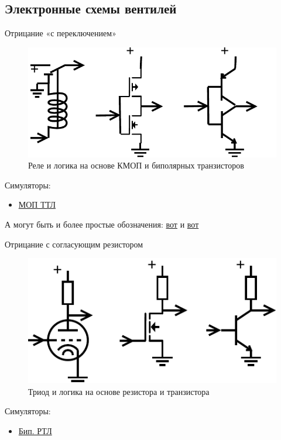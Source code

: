 \documentclass[xetex,aspectratio=43]{beamer}
\begin{document}
\subsection{Электронные схемы вентилей}

\begin{frame}{Отрицание «с переключением»}
    \begin{figure}
        \includegraphics[height=0.5\textheight]{img/07.not_switch.pdf}
        \caption{Реле и логика на основе КМОП и биполярных транзисторов}
    \end{figure}
    Симуляторы:
    \begin{itemize}
        \item \href{https://www.falstad.com/circuit/e-cmosinverter.html}{МОП ТТЛ}
    \end{itemize}
    \pause
    А могут быть и более простые обозначения: \href{https://en.wikipedia.org/wiki/CMOS}{вот} и \href{https://github.com/dluciv/Computer_Architecture-SPbU-CB.5080/tree/main/circuits}{вот}
\end{frame}

\begin{frame}{Отрицание с согласующим резистором}
    \begin{figure}
        \includegraphics[height=0.5\textheight]{img/07.not_resist.pdf}
        \caption{Триод и логика на основе резистора и транзистора}
    \end{figure}
    Симуляторы:
    \begin{itemize}
        \item \href{https://www.falstad.com/circuit/e-rtlinverter.html}{Бип. РТЛ}
    \end{itemize}
\end{frame}
\end{document}
